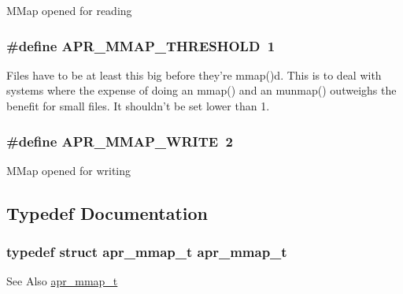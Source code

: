 M\-Map opened for reading \hypertarget{group__apr__mmap_ga19d1916e7b64bfb1a969648fe7b0846a}{
\subsubsection[{A\-P\-R\-\_\-\-M\-M\-A\-P\-\_\-\-T\-H\-R\-E\-S\-H\-O\-L\-D}]{\setlength{\rightskip}{0pt plus 5cm}\#define A\-P\-R\-\_\-\-M\-M\-A\-P\-\_\-\-T\-H\-R\-E\-S\-H\-O\-L\-D~1}}\label{group__apr__mmap_ga19d1916e7b64bfb1a969648fe7b0846a}
Files have to be at least this big before they're mmap()d. This is to deal with systems where the expense of doing an mmap() and an munmap() outweighs the benefit for small files. It shouldn't be set lower than 1. \hypertarget{group__apr__mmap_gac2eb7f697d8bf190e630b85f967c8273}{
\subsubsection[{A\-P\-R\-\_\-\-M\-M\-A\-P\-\_\-\-W\-R\-I\-T\-E}]{\setlength{\rightskip}{0pt plus 5cm}\#define A\-P\-R\-\_\-\-M\-M\-A\-P\-\_\-\-W\-R\-I\-T\-E~2}}\label{group__apr__mmap_gac2eb7f697d8bf190e630b85f967c8273}
M\-Map opened for writing 

\subsection{Typedef Documentation}
\hypertarget{group__apr__mmap_ga766b01a3e1e0438d06dc88d76f826f80}{
\subsubsection[{apr\-\_\-mmap\-\_\-t}]{\setlength{\rightskip}{0pt plus 5cm}typedef struct {\bf apr\-\_\-mmap\-\_\-t} {\bf apr\-\_\-mmap\-\_\-t}}}\label{group__apr__mmap_ga766b01a3e1e0438d06dc88d76f826f80}
\begin{DoxySeeAlso}{See Also}
\hyperlink{structapr__mmap__t}{apr\-\_\-mmap\-\_\-t} 
\end{DoxySeeAlso}


